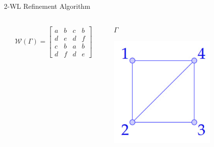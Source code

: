 \documentclass{beamer}
\begin{document}
\addtocounter{framenumber}{-1}
\begin{frame}{2-WL Refinement Algorithm}
    \begin{columns}
        \begin{column}{0.7\textwidth}
        \begin{align*}
            \mathcal{W}(\Gamma) = \begin{bmatrix}
                a&b&c&b\\
                d&e&d&f\\
                c&b&a&b\\
                d&f&d&e
            \end{bmatrix}
        \end{align*}
        \end{column}

        \begin{column}{0.3\textwidth}
            \centering
            $\Gamma$
            
            \includegraphics[width=0.7\textwidth]{slides/pic_1.jpg}
        \end{column}
    \end{columns}
    

\end{frame}
\end{document}
